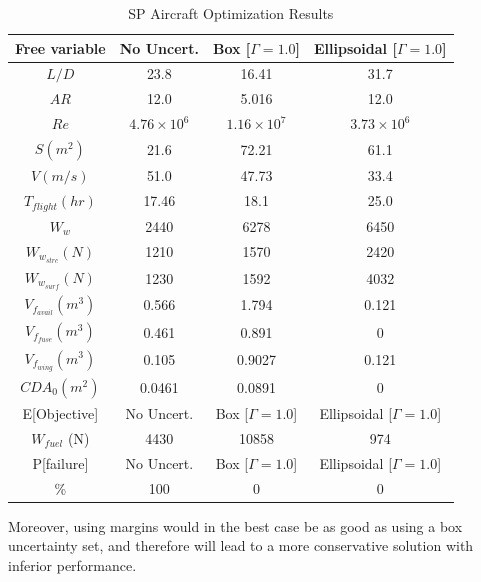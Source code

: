 \begin{table}[!h]
\begin{center}
\caption{\label{tab:results} SP Aircraft Optimization Results }
\begin{tabular}{c c c c}
\hline
Free variable & No Uncert. & Box [$\Gamma = 1.0$] & Ellipsoidal [$\Gamma = 1.0$] \\
\hline
$L/D$ & 23.8 & 16.41 & 31.7 \\
$AR$ & 12.0 & 5.016 & 12.0 \\
$Re$ & $4.76 \times 10^6$ & $1.16 \times 10^7$ & $3.73 \times 10^6$ \\
$S (m^2) $ & 21.6 & 72.21 & 61.1 \\
$V (m/s)$ & 51.0 & 47.73 & 33.4 \\
$T_{flight} (hr)$ & 17.46 & 18.1 & 25.0 \\
$W_w$ & 2440 & 6278 & 6450 \\
$W_{w_{strc}} (N)$ & 1210 & 1570 & 2420 \\
$W_{w_{surf}} (N)$ & 1230 & 1592 & 4032 \\
$V_{f_{avail}} (m^3)$ & 0.566 & 1.794 & 0.121 \\
$V_{f_{fuse}} (m^3)$ & 0.461 & 0.891 & 0 \\
$V_{f_{wing}} (m^3)$ & 0.105 & 0.9027 & 0.121 \\
$CDA_0 (m^2)$ & 0.0461 & 0.0891 & 0 \\
\hline
E[Objective] & No Uncert. & Box [$\Gamma = 1.0$] & Ellipsoidal [$\Gamma = 1.0$] \\
\hline
$W_{fuel} $ (N) & 4430 & 10858 & 974 \\
\hline
P[failure] & No Uncert. & Box [$\Gamma = 1.0$] & Ellipsoidal [$\Gamma = 1.0$] \\
\hline
\% & 100 & 0 & 0\\
\hline
\end{tabular}
\end{center}
\end{table}


Moreover, using margins would in the best case be as good as using a box uncertainty set, and therefore will lead
to a more conservative solution with inferior performance.

